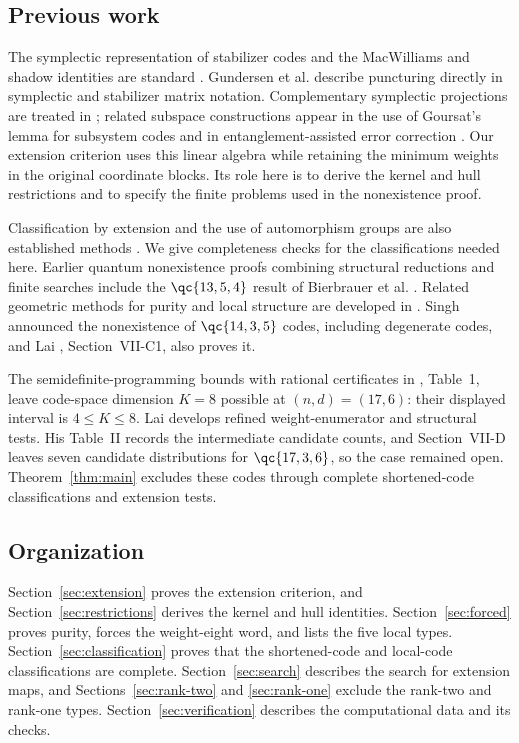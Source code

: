 \subsection{Previous work}

The symplectic representation of stabilizer codes and the MacWilliams and
shadow identities are standard \cite{crss,rains}. Gundersen et al.
\cite{puncturing} describe puncturing directly in symplectic and stabilizer
matrix notation. Complementary symplectic projections are treated in
\cite{anticodes}; related subspace constructions appear in the use of
Goursat's lemma for subsystem codes \cite{goursat} and in
entanglement-assisted error correction \cite{catalytic}.
Our extension criterion uses this linear algebra while retaining the
minimum weights in the original coordinate blocks. Its role here is to
derive the kernel and hull restrictions and to specify the finite
problems used in the nonexistence proof.

Classification by extension and the use of automorphism groups are also
established methods \cite{kaski}. We give completeness checks for the
classifications needed here. Earlier quantum nonexistence proofs
combining structural reductions and finite searches include the
\(\qc{13,5,4}\) result of Bierbrauer et al. \cite{bierbrauer}.
Related geometric methods for purity and local structure are developed
in \cite{geometry}. Singh \cite{singh} announced the nonexistence of
\(\qc{14,3,5}\) codes, including degenerate codes, and Lai \cite{lai},
Section~VII-C1, also proves it.

The semidefinite-programming bounds with rational certificates in
\cite{sdp}, Table~1, leave code-space dimension \(K=8\) possible at
\((n,d)=(17,6)\): their displayed interval is \(4\leq K\leq8\).
Lai \cite{lai} develops refined weight-enumerator and structural tests.
His Table~II records the intermediate candidate counts, and
Section~VII-D leaves seven candidate distributions for
\(\qc{17,3,6}\), so the case remained open. Theorem~\ref{thm:main}
excludes these codes through complete shortened-code classifications and
extension tests.

\subsection{Organization}

Section~\ref{sec:extension} proves the extension criterion, and
Section~\ref{sec:restrictions} derives the kernel and hull identities.
Section~\ref{sec:forced} proves purity, forces the weight-eight word, and
lists the five local types. Section~\ref{sec:classification} proves that
the shortened-code and local-code classifications are complete.
Section~\ref{sec:search} describes the search for extension maps, and
Sections~\ref{sec:rank-two} and \ref{sec:rank-one} exclude the rank-two
and rank-one types. Section~\ref{sec:verification} describes the
computational data and its checks.
